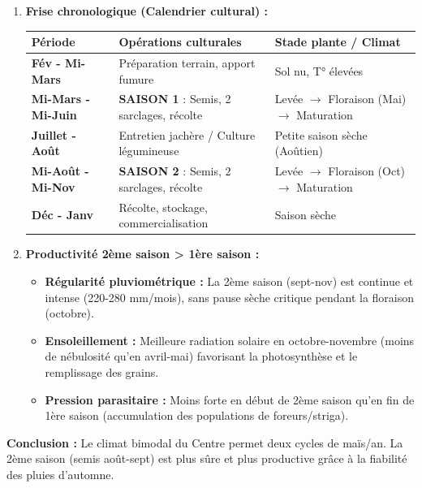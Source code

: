 \documentclass[11pt]{article}
\begin{document}
\begin{exoresolu}
\begin{enumerate}
\begin{itemize}
        \item \textbf{Saison 2 :} Semis \textbf{mi-août / début septembre} $\to$ Récolte \textbf{mi-novembre / début décembre}. (Avant l'arrêt des pluies en décembre).
    \end{itemize}
    \item \textbf{Frise chronologique (Calendrier cultural) :}
    \begin{center}
    \begin{tabular}{|l|l|l|}\hline
    \rowcolor{popblueL} \textbf{Période} & \textbf{Opérations culturales} & \textbf{Stade plante / Climat} \\ \hline
    \textbf{Fév - Mi-Mars} & Préparation terrain, apport fumure & Sol nu, T° élevées \\ \hline
    \textbf{Mi-Mars - Mi-Juin} & \textbf{SAISON 1} : Semis, 2 sarclages, récolte & Levée $\to$ Floraison (Mai) $\to$ Maturation \\ \hline
    \textbf{Juillet - Août} & Entretien jachère / Culture légumineuse & Petite saison sèche (Aoûtien) \\ \hline
    \textbf{Mi-Août - Mi-Nov} & \textbf{SAISON 2} : Semis, 2 sarclages, récolte & Levée $\to$ Floraison (Oct) $\to$ Maturation \\ \hline
    \textbf{Déc - Janv} & Récolte, stockage, commercialisation & Saison sèche \\ \hline
    \end{tabular}
    \end{center}
    \item \textbf{Productivité 2ème saison > 1ère saison :}
    \begin{itemize}
        \item \textbf{Régularité pluviométrique :} La 2ème saison (sept-nov) est continue et intense (220-280 mm/mois), sans pause sèche critique pendant la floraison (octobre).
        \item \textbf{Ensoleillement :} Meilleure radiation solaire en octobre-novembre (moins de nébulosité qu'en avril-mai) favorisant la photosynthèse et le remplissage des grains.
        \item \textbf{Pression parasitaire :} Moins forte en début de 2ème saison qu'en fin de 1ère saison (accumulation des populations de foreurs/striga).
    \end{itemize}
\end{enumerate}
\textbf{Conclusion :} Le climat bimodal du Centre permet deux cycles de maïs/an. La 2ème saison (semis août-sept) est plus sûre et plus productive grâce à la fiabilité des pluies d'automne.
\end{exoresolu}
\end{document}
